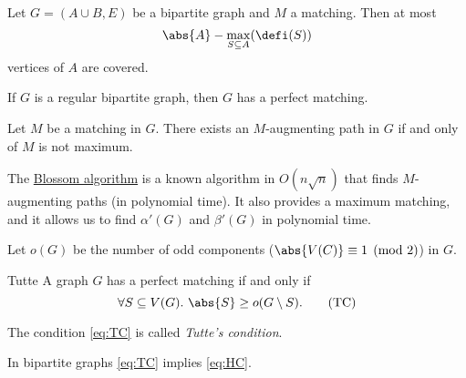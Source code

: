 \begin{theorem}
    Let $G = (A \cup B, E)$ be a bipartite graph and $M$ a matching. Then at 
    most
    \[
        \abs{A} - \max_{S \subseteq A}(\defi(S))
    \]
    vertices of $A$ are covered.
\end{theorem}


\begin{theorem}
    If $G$ is a regular bipartite graph, then $G$ has a perfect matching.
\end{theorem}



\begin{theorem}
    Let $M$ be a matching in $G$. There exists an $M$-augmenting path in $G$ if and only of $M$ is not maximum.
\end{theorem}


The \href{https://en.wikipedia.org/wiki/Blossom_algorithm}{Blossom algorithm} is a known algorithm in $O(n\sqrt{n})$ that finds $M$-augmenting paths
(in polynomial time). It also provides a maximum matching, and it allows us to find $\alpha'(G)$ and $\beta'(G)$ in polynomial time.

Let $o(G)$ be the number of odd components ($\abs{V(C)} \equiv 1 \pmod{2}$) in $G$.

\begin{theorem}{Tutte}
    A graph $G$ has a perfect matching if and only if 
    \begin{equation}
        \forall S\subseteq V(G).~\abs{S}\ge o(G \setminus S). 
        \tag{TC}
        \label{eq:TC}
    \end{equation}
\end{theorem}

The condition \eqref{eq:TC} is called \emph{Tutte's condition}.


\begin{remark}
    In bipartite graphs \eqref{eq:TC} implies \eqref{eq:HC}.
    \label{rmk:TCHC}
\end{remark}

